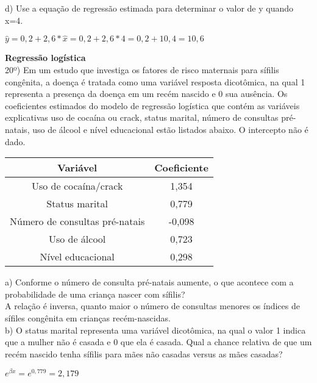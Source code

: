 \documentclass[12pt,a4paper]{article}
\begin{document}
	\vspace{1cm}
	d) Use a equação de regressão estimada para determinar o valor de y quando x=4.
	\vspace{0.5cm}
	\begin{center}
		$\hat{y} = 0,2 + 2,6*\hat{x} = 0,2 + 2,6*4 = 0,2 + 10,4 = 10,6$ 
	\end{center}
	\vspace{1cm}
	\textbf{Regressão logística}\\
	20º) Em um estudo que investiga os fatores de risco maternais para sífilis congênita, a doença é tratada como uma variável resposta dicotômica, na qual 1 representa a presença da doença em um recém nascido e 0 sua ausência. Os coeficientes estimados do modelo de regressão logística que contém as variáveis explicativas uso de cocaína ou crack, status marital, número de consultas pré-natais, uso de álcool e nível educacional estão listados abaixo. O intercepto não é dado.
	\begin{center}
		\begin{tabular}{|c|c|}\hline
			\textbf{Variável} & \textbf{Coeficiente}\\ \hline
			Uso de cocaína/crack & 1,354\\ \hline
			Status marital & 0,779\\ \hline
			Número de consultas pré-natais & -0,098\\ \hline
			Uso de álcool & 0,723\\ \hline
			Nível educacional & 0,298\\ \hline
		\end{tabular}
	\end{center}
	a) Conforme o número de consulta pré-natais aumente, o que acontece com a probabilidade de uma criança nascer com sífilis?
	\vspace{0.5cm}\\
	A relação é inversa, quanto maior o número de consultas menores os índices de sífiles congênita em crianças recém-nascidas.
	\vspace{1cm}\\
	b) O status marital representa uma variável dicotômica, na qual o valor 1 indica que a mulher não é casada e 0 que ela é casada. Qual a chance relativa de que um recém nascido
	tenha sífilis para mães não casadas versus as mães casadas?
	\vspace{0.5cm}\\
	\begin{center}
		$e^{\beta x} = e^{0,779} = 2,179$
	\end{center}
\end{document}
